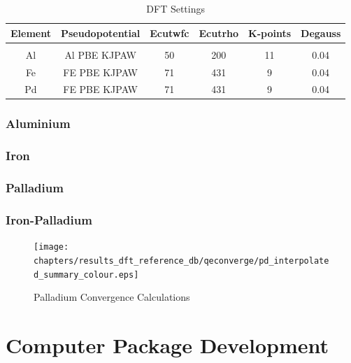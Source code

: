 \begin{table}[h]
\begin{center}
\begin{tabular}{c c c c c c}
\hline
Element & Pseudopotential & Ecutwfc & Ecutrho & K-points & Degauss \\
\hline \\
Al & Al PBE KJPAW & 50 & 200 & 11 & 0.04 \\
Fe & FE PBE KJPAW & 71 & 431 & 9 & 0.04 \\ 
Pd & FE PBE KJPAW & 71 & 431 & 9 & 0.04 \\ 
\end{tabular}
\end{center}
\caption{DFT Settings}
\end{table}




\subsubsection{Aluminium}






\subsubsection{Iron}




\subsubsection{Palladium}



\subsubsection{Iron-Palladium}





\begin{figure}[h]
  \begin{center}
    \texttt{[image: chapters/results\_dft\_reference\_db/qeconverge/pd\_interpolated\_summary\_colour.eps]}
    \caption{Palladium Convergence Calculations}
    \label{graph:graph1}
  \end{center}
\end{figure}



\section{Computer Package Development}
 

